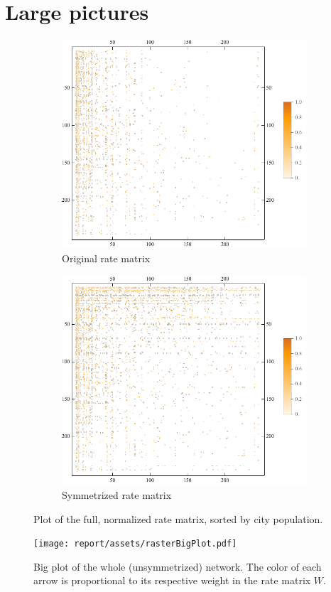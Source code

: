 \section{Large pictures}

\begin{figure}[h]
    \centering
     \begin{subfigure}[h]{.65\textwidth}
         \centering
         \includegraphics[width=\textwidth]{assets/asymmPlotFull.pdf}
         \caption{Original rate matrix}
         \label{fig:asymm-plot-full}
     \end{subfigure}
     \hfill
     \begin{subfigure}[h]{.65\textwidth}
         \centering
         \includegraphics[width=\textwidth]{assets/symmPlotFull.pdf}
         \caption{Symmetrized rate matrix}
         \label{fig:symm-plot}
     \end{subfigure}
     \caption{Plot of the full, normalized rate matrix, sorted by city population.}
\end{figure}

\begin{figure}[b]
    \centering
    \texttt{[image: report/assets/rasterBigPlot.pdf]}
    \caption{Big plot of the whole (unsymmetrized) network. The color of each arrow is proportional to its respective weight in the rate matrix $W$.}
    \label{fig:big-plot}
\end{figure}

